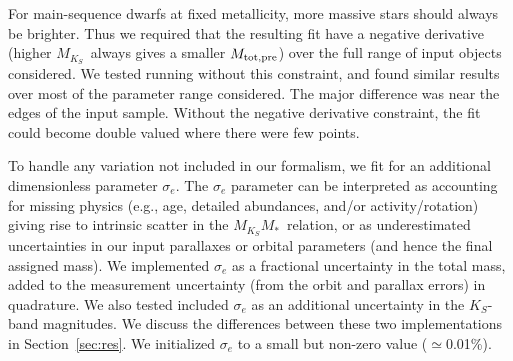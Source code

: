 \documentclass[twocolumn]{aastex62}
\newcommand{\mks}{$M_{K_S}$}
\newcommand{\mmk}{$M_{K_S}$\textendash$M_*$}
\newcommand{\mpred}{$M_{\rm{tot,pre}}$}
\begin{document}
For main-sequence dwarfs at fixed metallicity, more massive stars should always be brighter. Thus we required that the resulting fit have a negative derivative (higher \mks\ always gives a smaller \mpred) over the full range of input objects considered. We tested running without this constraint, and found similar results over most of the parameter range considered. The major difference was near the edges of the input sample. Without the negative derivative constraint, the fit could become double valued where there were few points.

To handle any variation not included in our formalism, we fit for an additional dimensionless parameter $\sigma_e$. The $\sigma_e$ parameter can be interpreted as accounting for missing physics (e.g., age, detailed abundances, and/or activity/rotation) giving rise to intrinsic scatter in the \mmk\ relation, or as underestimated uncertainties in our input parallaxes or orbital parameters (and hence the final assigned mass). We implemented $\sigma_e$ as a fractional uncertainty in the total mass, added to the measurement uncertainty (from the orbit and parallax errors) in quadrature. We also tested included $\sigma_e$ as an additional uncertainty in the $K_S$-band magnitudes. We discuss the differences between these two implementations in Section~\ref{sec:res}. We initialized $\sigma_e$ to a small but non-zero value ($\simeq$0.01\%).
\end{document}
